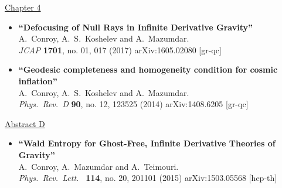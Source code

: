 \begin{pubs}
\begin{itemize}
\end{itemize}
\underline{Chapter 4}
\begin{itemize}
\item%
{\bf ``Defocusing of Null Rays in Infinite Derivative Gravity''}
  \\{}A.~Conroy, A.~S.~Koshelev and A.~Mazumdar.
   \\ %
  {}\emph{JCAP} {\bf 1701}, no. 01, 017 (2017) {}arXiv:1605.02080 [gr-qc]
\item%
{\bf ``Geodesic completeness and homogeneity condition for cosmic inflation''}
  \\{}A.~Conroy, A.~S.~Koshelev and A.~Mazumdar.
  \\{}\emph{Phys.\ Rev.\ D} {\bf 90}, no. 12, 123525 (2014) {}arXiv:1408.6205 [gr-qc]
\end{itemize}
\underline{Abstract D}
\begin{itemize}
\item%
{\bf ``Wald Entropy for Ghost-Free, Infinite Derivative Theories of Gravity''}
  \\{}A.~Conroy, A.~Mazumdar and A.~Teimouri.
  \\{}\emph{Phys.\ Rev.\ Lett.\ }  {\bf 114}, no. 20, 201101 (2015){} arXiv:1503.05568 [hep-th]



\end{itemize}
\end{pubs}

